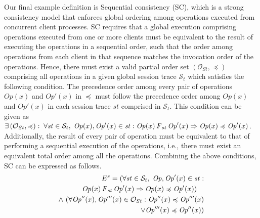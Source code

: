 \documentclass[journal,compsoc]{IEEEtran}
\begin{document}
Our final example definition is  Sequential consistency (SC), which is a strong consistency model that enforces global ordering among operations executed from concurrent client processes. SC requires that a global execution comprising operations executed from one or more clients must be equivalent to the result of executing the operations in a sequential order, such that the order among operations from each client in that sequence matches the invocation order of the operations.  Hence, there must exist a valid partial order set $\left( {\mathcal{O}_{St}}, \preccurlyeq \right)$ comprising all operations in a given global session trace $\mathcal{S}_t$ which satisfies the following condition. The precedence order among every pair of operations ${\mathit{Op}}(x)$ and ${\mathit{Op}}'(x)$ in  $ \preccurlyeq$ must follow the  precedence order among ${\mathit{Op}}(x)$ and ${\mathit{Op}}'(x)$ in each session trace $\mathit{st}$ comprised in  $\mathcal{S}_t$.  This condition can be given as $\exists \left( {\mathcal{O}_{St}}, \preccurlyeq \right) : \; \forall \mathit{st} \in \mathcal{S}_t, \; {\mathit{Op}}(x), {\mathit{Op}}'(x) \in \mathit{st}: 
 \mathit{Op}(x) \operatorname{\it F}_\mathit{st} {\mathit{Op}}'(x) \Rightarrow  {\mathit{Op}}(x) \preccurlyeq {\mathit{Op}}'(x)$. Additionally, the result of every pair of operation must be equivalent to that of performing a sequential execution of the operations, i.e., there must exist an equivalent total order among all the operations. Combining the above conditions, SC can be expressed as follows. 
%
\begin{align}\label{eqn:SC}
\begin{split}
    E^{s} =  (\forall \mathit{st} \in \mathcal{S}_t, \; {\mathit{Op}}, {\mathit{Op}}'(x) \in \mathit{st}: \\ 
 \mathit{Op}(x) \operatorname{\it F}_\mathit{st} {\mathit{Op}}'(x) \Rightarrow  {\mathit{Op}}(x) \preccurlyeq {\mathit{Op}}'(x)) \quad \\ \wedge \ (\forall  {\mathit{Op}}''(x), {\mathit{Op}}'''(x) \in \mathcal{O}_{St} :  {\mathit{Op}}''(x) \preccurlyeq {\mathit{Op}}'''(x) \\ \vee {\mathit{Op}}'''(x) \preccurlyeq {\mathit{Op}}''(x)) %
\end{split}
\end{align}
\end{document}
